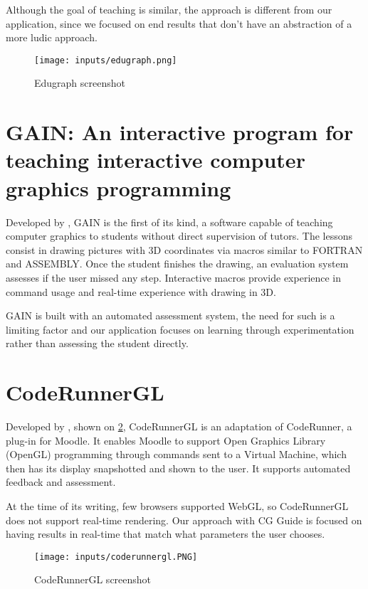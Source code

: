 \documentclass[cic,tc,english]{iiufrgs}
\begin{document}
Although the goal of teaching is similar, the approach is different from our application, since we focused on end results that don't have an abstraction of a more ludic approach.

\begin{figure}[hbt!]
    \caption{Edugraph screenshot}
    \begin{center}
        \texttt{[image: inputs/edugraph.png]}
    \end{center}
    \label{edugraphimage}
\end{figure}

\section{GAIN: An interactive program for teaching interactive computer graphics programming}
Developed by \citet{Towle1978Gain}, GAIN is the first of its kind, a software capable of teaching computer graphics to students without direct supervision of tutors. The lessons consist in drawing pictures with 3D coordinates via macros similar to FORTRAN and ASSEMBLY. Once the student finishes the drawing, an evaluation system assesses if the user missed any step. Interactive macros provide experience in command usage and real-time experience with drawing in 3D.

GAIN is built with an automated assessment system, the need for such is a limiting factor and our application focuses on learning through experimentation rather than assessing the student directly.

\section{CodeRunnerGL}
Developed by \citet{Wunsche2019CodeRunnerGL}, shown on \cref{coderunnerglimage}, CodeRunnerGL is an adaptation of CodeRunner, a plug-in for Moodle. It enables Moodle to support Open Graphics Library (OpenGL) programming through commands sent to a Virtual Machine, which then has its display snapshotted and shown to the user. It supports automated feedback and assessment.

At the time of its writing, few browsers supported WebGL, so CodeRunnerGL does not support real-time rendering. Our approach with CG Guide is focused on having results in real-time that match what parameters the user chooses.

\begin{figure}[hbt!]
    \caption{CodeRunnerGL screenshot}
    \begin{center}
        \texttt{[image: inputs/coderunnergl.PNG]}
    \end{center}
    \label{coderunnerglimage}
\end{figure}
\end{document}
